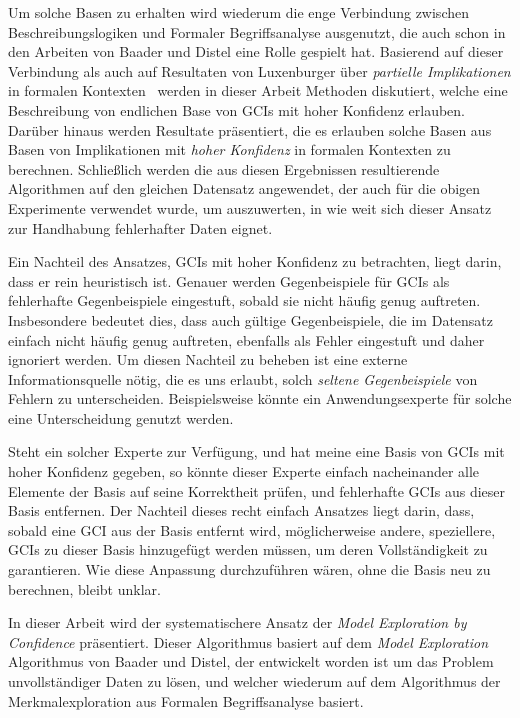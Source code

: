 \documentclass[ngerman,fleqn,DIV=12]{scrartcl}
\begin{document}
Um solche Basen zu erhalten wird wiederum die enge Verbindung zwischen
Beschreibungslogiken und Formaler Begriffsanalyse ausgenutzt, die auch schon in den
Arbeiten von Baader und Distel eine Rolle gespielt hat.  Basierend auf dieser Verbindung
als auch auf Resultaten von Luxenburger über \emph{partielle Implikationen} in formalen
Kontexten~\cite{diss:Luxenburger} werden in dieser Arbeit Methoden diskutiert, welche eine
Beschreibung von endlichen Base von GCIs mit hoher Konfidenz erlauben.  Darüber hinaus
werden Resultate präsentiert, die es erlauben solche Basen aus Basen von Implikationen mit
\emph{hoher Konfidenz} in formalen Kontexten zu berechnen.  Schließlich werden die aus
diesen Ergebnissen resultierende Algorithmen auf den gleichen Datensatz angewendet, der
auch für die obigen Experimente verwendet wurde, um auszuwerten, in wie weit sich dieser
Ansatz zur Handhabung fehlerhafter Daten eignet.

Ein Nachteil des Ansatzes, GCIs mit hoher Konfidenz zu betrachten, liegt darin, dass er
rein heuristisch ist.  Genauer werden Gegenbeispiele für GCIs als fehlerhafte
Gegenbeispiele eingestuft, sobald sie nicht häufig genug auftreten.  Insbesondere bedeutet
dies, dass auch gültige Gegenbeispiele, die im Datensatz einfach nicht häufig genug
auftreten, ebenfalls als Fehler eingestuft und daher ignoriert werden.  Um diesen Nachteil
zu beheben ist eine externe Informationsquelle nötig, die es uns erlaubt, solch
\emph{seltene Gegenbeispiele} von Fehlern zu unterscheiden.  Beispielsweise könnte ein
Anwendungsexperte für solche eine Unterscheidung genutzt werden.

Steht ein solcher Experte zur Verfügung, und hat meine eine Basis von GCIs mit hoher
Konfidenz gegeben, so könnte dieser Experte einfach nacheinander alle Elemente der Basis
auf seine Korrektheit prüfen, und fehlerhafte GCIs aus dieser Basis entfernen.  Der
Nachteil dieses recht einfach Ansatzes liegt darin, dass, sobald eine GCI aus der Basis
entfernt wird, möglicherweise andere, speziellere, GCIs zu dieser Basis hinzugefügt werden
müssen, um deren Vollständigkeit zu garantieren.  Wie diese Anpassung durchzuführen wären,
ohne die Basis neu zu berechnen, bleibt unklar.

In dieser Arbeit wird der systematischere Ansatz der \emph{Model Exploration by
  Confidence} präsentiert.  Dieser Algorithmus basiert auf dem \emph{Model Exploration}
Algorithmus von Baader und Distel, der entwickelt worden ist um das Problem
unvollständiger Daten zu lösen, und welcher wiederum auf dem Algorithmus der
Merkmalexploration aus Formalen Begriffsanalyse basiert.
\end{document}
